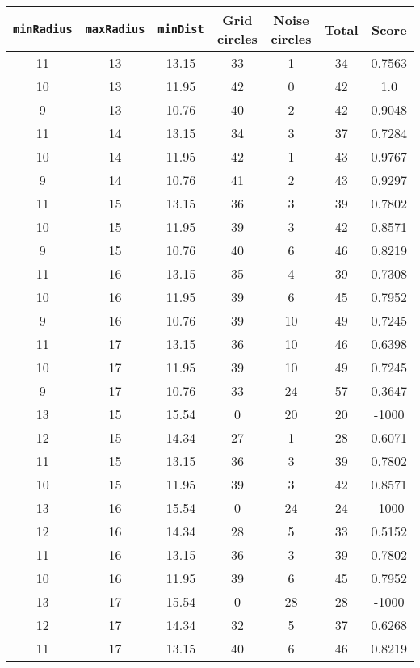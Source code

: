 \documentclass[letterpaper, 12pt]{article}
\begin{document}
\begin{longtable}{|c|c|c|c|c|c|c|}
\hline
\textbf{\texttt{minRadius}} & \textbf{\texttt{maxRadius}} & \textbf{\texttt{minDist}} & \textbf{Grid circles} & \textbf{Noise circles} & \textbf{Total} & \textbf{Score} \\
\hline
11 & 13 & 13.15 & 33 & 1 & 34 & 0.7563 \\
\hline
10 & 13 & 11.95 & 42 & 0 & 42 & 1.0 \\
\hline
9 & 13 & 10.76 & 40 & 2 & 42 & 0.9048 \\
\hline
11 & 14 & 13.15 & 34 & 3 & 37 & 0.7284 \\
\hline
10 & 14 & 11.95 & 42 & 1 & 43 & 0.9767 \\
\hline
9 & 14 & 10.76 & 41 & 2 & 43 & 0.9297 \\
\hline
11 & 15 & 13.15 & 36 & 3 & 39 & 0.7802 \\
\hline
10 & 15 & 11.95 & 39 & 3 & 42 & 0.8571 \\
\hline
9 & 15 & 10.76 & 40 & 6 & 46 & 0.8219 \\
\hline
11 & 16 & 13.15 & 35 & 4 & 39 & 0.7308 \\
\hline
10 & 16 & 11.95 & 39 & 6 & 45 & 0.7952 \\
\hline
9 & 16 & 10.76 & 39 & 10 & 49 & 0.7245 \\
\hline
11 & 17 & 13.15 & 36 & 10 & 46 & 0.6398 \\
\hline
10 & 17 & 11.95 & 39 & 10 & 49 & 0.7245 \\
\hline
9 & 17 & 10.76 & 33 & 24 & 57 & 0.3647 \\
\hline
13 & 15 & 15.54 & 0 & 20 & 20 & -1000 \\
\hline
12 & 15 & 14.34 & 27 & 1 & 28 & 0.6071 \\
\hline
11 & 15 & 13.15 & 36 & 3 & 39 & 0.7802 \\
\hline
10 & 15 & 11.95 & 39 & 3 & 42 & 0.8571 \\
\hline
13 & 16 & 15.54 & 0 & 24 & 24 & -1000 \\
\hline
12 & 16 & 14.34 & 28 & 5 & 33 & 0.5152 \\
\hline
11 & 16 & 13.15 & 36 & 3 & 39 & 0.7802 \\
\hline
10 & 16 & 11.95 & 39 & 6 & 45 & 0.7952 \\
\hline
13 & 17 & 15.54 & 0 & 28 & 28 & -1000 \\
\hline
12 & 17 & 14.34 & 32 & 5 & 37 & 0.6268 \\
\hline
11 & 17 & 13.15 & 40 & 6 & 46 & 0.8219 \\

\end{longtable}
\end{document}
